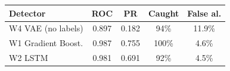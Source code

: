 \begin{tabular}{lcccc}
\hline
\textbf{Detector} & \textbf{ROC} & \textbf{PR} & \textbf{Caught} & \textbf{False al.} \\ \hline
W4 VAE (no labels) & 0.897 & 0.182 & 94\% & 11.9\% \\
W1 Gradient Boost. & 0.987 & 0.755 & 100\% & 4.6\% \\
W2 LSTM & 0.981 & 0.691 & 92\% & 4.5\% \\
\hline
\end{tabular}
